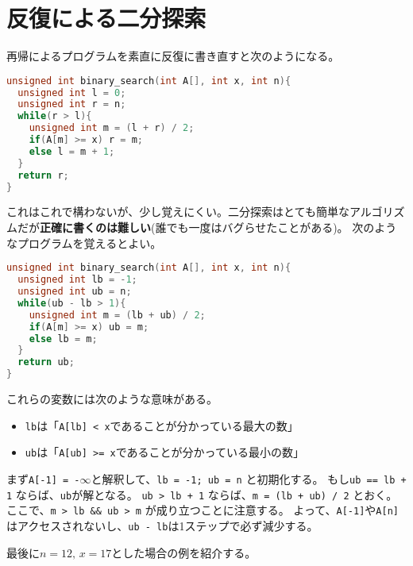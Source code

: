 \documentclass[a4paper,twoside,onecolumn,openany,article,10pt]{memoir}
\theoremstyle{remark}
\begin{document}
\section{反復による二分探索}
再帰によるプログラムを素直に反復に書き直すと次のようになる。
\begin{lstlisting}[basicstyle=\ttfamily\normalsize,showstringspaces=false,language=C,frame=single]
unsigned int binary_search(int A[], int x, int n){
  unsigned int l = 0;
  unsigned int r = n;
  while(r > l){
    unsigned int m = (l + r) / 2;
    if(A[m] >= x) r = m;
    else l = m + 1;
  }
  return r;
}
\end{lstlisting}
これはこれで構わないが、少し覚えにくい。二分探索はとても簡単なアルゴリズムだが\textbf{正確に書くのは難しい}(誰でも一度はバグらせたことがある)。
次のようなプログラムを覚えるとよい。
\begin{lstlisting}[basicstyle=\ttfamily\normalsize,showstringspaces=false,language=C,frame=single]
unsigned int binary_search(int A[], int x, int n){
  unsigned int lb = -1;
  unsigned int ub = n;
  while(ub - lb > 1){
    unsigned int m = (lb + ub) / 2;
    if(A[m] >= x) ub = m;
    else lb = m;
  }
  return ub;
}
\end{lstlisting}
これらの変数には次のような意味がある。
\begin{itemize}
\item \texttt{lb}は「\texttt{A[lb] < x}であることが分かっている最大の数」
\item \texttt{ub}は「\texttt{A[ub] >= x}であることが分かっている最小の数」
\end{itemize}
まず\texttt{A[-1] = -$\infty$}と解釈して、\texttt{lb = -1; ub = n} と初期化する。
もし\texttt{ub == lb + 1} ならば、\texttt{ub}が解となる。
\texttt{ub > lb + 1} ならば、\texttt{m = (lb + ub) / 2} とおく。
ここで、\texttt{m > lb \&\& ub > m} が成り立つことに注意する。
よって、\texttt{A[-1]}や\texttt{A[n]}はアクセスされないし、\texttt{ub - lb}は1ステップで必ず減少する。


最後に$n=12,\, x = 17$とした場合の例を紹介する。

\begin{center}
\end{center}
\end{document}
